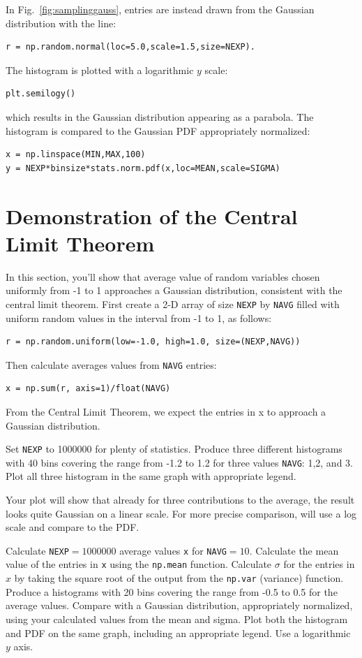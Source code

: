 In Fig.~\ref{fig:samplinggauss}, entries are instead drawn from the Gaussian distribution with the line:
\begin{verbatim}
r = np.random.normal(loc=5.0,scale=1.5,size=NEXP).
\end{verbatim}
The histogram is plotted with a logarithmic $y$ scale:
\begin{verbatim}
plt.semilogy()
\end{verbatim}
which results in the Gaussian distribution appearing as a parabola.  The histogram is compared to the Gaussian PDF appropriately normalized:
\begin{verbatim}
x = np.linspace(MIN,MAX,100)
y = NEXP*binsize*stats.norm.pdf(x,loc=MEAN,scale=SIGMA)
\end{verbatim}


\section{Demonstration of the Central Limit Theorem}

In this section, you'll show that average value of random variables
chosen uniformly from -1 to 1 approaches a Gaussian distribution,
consistent with the central limit theorem.  First create a 2-D array
of size {\tt NEXP} by {\tt NAVG} filled with uniform random values in
the interval from -1 to 1, as follows:
\begin{verbatim}
r = np.random.uniform(low=-1.0, high=1.0, size=(NEXP,NAVG))
\end{verbatim}
Then calculate averages values from {\tt NAVG} entries:
\begin{verbatim}
x = np.sum(r, axis=1)/float(NAVG)  
\end{verbatim}
From the Central Limit Theorem, we expect the entries in x to approach a Gaussian distribution.

\begin{plot}  Set {\tt NEXP} to 1000000 for plenty of statistics.
Produce three different histograms with 40 bins covering the range
from -1.2 to 1.2 for three values {\tt NAVG}: 1,2, and 3.  Plot all
three histogram in the same graph with appropriate legend. \end{plot}

Your plot will show that already for three contributions to the average, the result looks quite Gaussian on a linear scale.  For more precise comparison, will use a log scale and compare to the PDF.

\begin{plot} Calculate {\tt NEXP}$=1000000$ average values {\tt x} for {\tt NAVG}$=10$.  Calculate the mean value of the entries in {\tt x} using the {\tt np.mean} function.  Calculate $\sigma$ for the entries in $x$ by taking the square root of the output from the {\tt np.var} (variance) function.  Produce a histograms with 20 bins covering the range
from -0.5 to 0.5 for the average values.  Compare with a Gaussian distribution, appropriately normalized, using your calculated values from the  mean and sigma.  Plot both the histogram and PDF on the same graph, including an appropriate legend.  Use a logarithmic $y$ axis. \end{plot}


